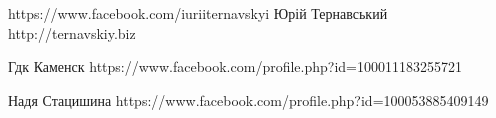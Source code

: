  
 
 
 
 

https://www.facebook.com/iuriiternavskyi
Юрій Тернавський
http://ternavskiy.biz





Гдк Каменск
https://www.facebook.com/profile.php?id=100011183255721

Надя Стацишина
https://www.facebook.com/profile.php?id=100053885409149

